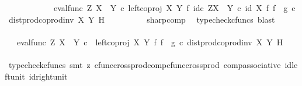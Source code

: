 \begin{isabellebody}
\ \ \ \ \ \ \ \ \ \ \ \ {\isacharparenleft}{\kern0pt}{\isacharparenleft}{\kern0pt}eval{\isacharunderscore}{\kern0pt}func\ Z\ {\isacharparenleft}{\kern0pt}X\ {\isasymCoprod}\ Y{\isacharparenright}{\kern0pt}\ {\isasymcirc}\isactrlsub c\ left{\isacharunderscore}{\kern0pt}coproj\ X\ Y\ {\isasymtimes}\isactrlsub f\ id\isactrlsub c\ {\isacharparenleft}{\kern0pt}Z\isactrlbsup {\isacharparenleft}{\kern0pt}X\ {\isasymCoprod}\ Y{\isacharparenright}{\kern0pt}\isactrlesup {\isacharparenright}{\kern0pt}{\isacharparenright}{\kern0pt}\ {\isasymcirc}\isactrlsub c\ {\isacharparenleft}{\kern0pt}id\ X\ {\isasymtimes}\isactrlsub f\ {\isacharparenleft}{\kern0pt}f\isactrlsup {\isasymflat}\ {\isasymamalg}\ g\isactrlsup {\isasymflat}\ {\isasymcirc}\isactrlsub c\ dist{\isacharunderscore}{\kern0pt}prod{\isacharunderscore}{\kern0pt}coprod{\isacharunderscore}{\kern0pt}inv{}\ X\ Y\ H{\isacharparenright}{\kern0pt}\isactrlsup {\isasymsharp}{\isacharparenright}{\kern0pt}{\isacharparenright}{\kern0pt}\isactrlsup {\isasymsharp}{\isachardoublequoteclose}\isanewline
\ \ \ \ \ \ \ \ \isamarkupfalse%
\ sharp{\isacharunderscore}{\kern0pt}comp\ \isamarkupfalse%
\ {\isacharparenleft}{\kern0pt}typecheck{\isacharunderscore}{\kern0pt}cfuncs{\isacharcomma}{\kern0pt}\ blast{\isacharparenright}{\kern0pt}\isanewline
\ \ \ \ \ \ \isamarkupfalse%
\ \isamarkupfalse%
\ {\isachardoublequoteopen}{\isachardot}{\kern0pt}{\isachardot}{\kern0pt}{\isachardot}{\kern0pt}\ {\isacharequal}{\kern0pt}\ {\isacharparenleft}{\kern0pt}eval{\isacharunderscore}{\kern0pt}func\ Z\ {\isacharparenleft}{\kern0pt}X\ {\isasymCoprod}\ Y{\isacharparenright}{\kern0pt}\ {\isasymcirc}\isactrlsub c\ \ {\isacharparenleft}{\kern0pt}left{\isacharunderscore}{\kern0pt}coproj\ X\ Y\ {\isasymtimes}\isactrlsub f\ {\isacharparenleft}{\kern0pt}f\isactrlsup {\isasymflat}\ {\isasymamalg}\ g\isactrlsup {\isasymflat}\ {\isasymcirc}\isactrlsub c\ dist{\isacharunderscore}{\kern0pt}prod{\isacharunderscore}{\kern0pt}coprod{\isacharunderscore}{\kern0pt}inv{}\ X\ Y\ H{\isacharparenright}{\kern0pt}\isactrlsup {\isasymsharp}{\isacharparenright}{\kern0pt}{\isacharparenright}{\kern0pt}\isactrlsup {\isasymsharp}{\isachardoublequoteclose}\isanewline
\ \ \ \ \ \ \ \ \isamarkupfalse%
\ {\isacharparenleft}{\kern0pt}typecheck{\isacharunderscore}{\kern0pt}cfuncs{\isacharcomma}{\kern0pt}\ smt\ {\isacharparenleft}{\kern0pt}z{}{\isacharparenright}{\kern0pt}\ cfunc{\isacharunderscore}{\kern0pt}cross{\isacharunderscore}{\kern0pt}prod{\isacharunderscore}{\kern0pt}comp{\isacharunderscore}{\kern0pt}cfunc{\isacharunderscore}{\kern0pt}cross{\isacharunderscore}{\kern0pt}prod\ comp{\isacharunderscore}{\kern0pt}associative{}\ id{\isacharunderscore}{\kern0pt}left{\isacharunderscore}{\kern0pt}unit{}\ id{\isacharunderscore}{\kern0pt}right{\isacharunderscore}{\kern0pt}unit{}{\isacharparenright}{\kern0pt}\isanewline

\end{isabellebody}
